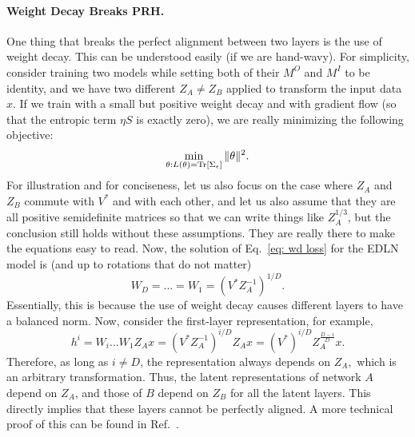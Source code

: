\documentclass[11pt]{article}
\theoremstyle{plain}
\newcommand{\Tr}{{\rm Tr}}
\begin{document}
\paragraph{Weight Decay Breaks PRH.} One thing that breaks the perfect alignment between two layers is the use of weight decay. This can be understood easily (if we are hand-wavy). For simplicity, consider training two models while setting both of their $M^O$ and $M^I$ to be identity, and we have two different $Z_A\neq Z_B$ applied to transform the input data $x$. If we train with a small but positive weight decay and with gradient flow (so that the entropic term $\eta S$ is exactly zero),  we are really minimizing the following objective:
\begin{equation}\label{eq: wd loss}
    \min_{\theta: L(\theta)=\Tr[\Sigma_\epsilon]} {\|\theta\|^2}.
\end{equation}
For illustration and for conciseness, let us also focus on the case where $Z_A$ and $Z_B$ commute with $V^*$ and with each other, and let us also assume that they are all positive semidefinite matrices so that we can write things like $Z_A^{1/3}$, but the conclusion still holds without these assumptions. They are really there to make the equations easy to read. Now, the solution of Eq.~\eqref{eq: wd loss} for the EDLN model is (and up to rotations that do not matter)
\begin{equation}
    W_D =... = W_1 = (V^* Z_A^{-1})^{1/D}.
\end{equation}
Essentially, this is because the use of weight decay causes different layers to have a balanced norm. Now, consider the first-layer representation, for example,
\begin{equation}
    h^i = W_i ... W_1  Z_A x =  (V^* Z_A^{-1})^{i/D}Z_A x = (V^*)^{i/D} Z_A^{\frac{D-i}{D}}x.
\end{equation}
Therefore, as long as $i\neq D$, the representation always depends on $Z_A,$ which is an arbitrary transformation. Thus, the latent representations of network $A$ depend on $Z_A$, and those of $B$ depend on $Z_B$ for all the latent layers. This directly implies that these layers cannot be perfectly aligned. A more technical proof of this can be found in Ref.~\cite{ziyin2025neural}.
\end{document}
